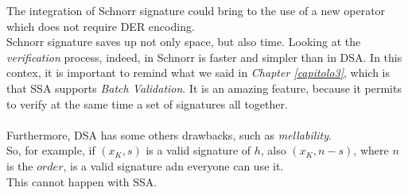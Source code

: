 The integration of Schnorr signature could bring to the use of a new operator which does not require DER encoding.\\
Schnorr signature saves up not only space, but also time.
Looking at the \textit{verification} process, indeed, in Schnorr is faster and simpler than in DSA. 
In this contex, it is important to remind what we said in \textit{Chapter \eqref{capitolo3}}, which is that SSA supports \textit{Batch Validation}. It is an amazing feature, because it permits to verify at the same time a set of signatures all together.\\
\\
Furthermore, DSA has some others drawbacks, such as \textit{mellability}.\\
So, for example, if $(x_{K},s)$ is a valid signature of $h$, also $(x_{K},n-s)$, where $n$ is the $order$, is a valid signature adn everyone can use it.\\
This cannot happen with SSA.\\

